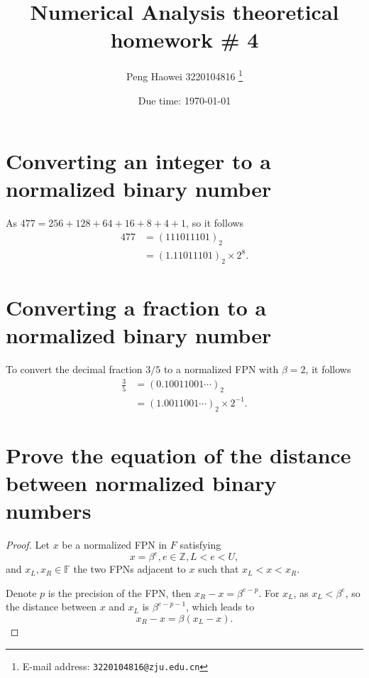 \documentclass[a4paper]{article}
\begin{document}
\title{\textbf{Numerical Analysis theoretical homework \# 4}}

\author{Peng Haowei 3220104816
  \thanks{E-mail address: \texttt{3220104816@zju.edu.cn}}}

\date{Due time: \today}

\maketitle

\section{Converting an integer to a normalized binary number}

As $477 = 256 + 128 + 64 + 16 + 8 + 4 + 1$, so it follows
\begin{equation}
    \begin{aligned}
        477 &= (111011101)_2 \\
        &= (1.11011101)_2 \times 2^8.
    \end{aligned}
    \label{eq:1_to_binary}
\end{equation}

\section{Converting a fraction to a normalized binary number}
\label{sec:2}

To convert the decimal fraction $3/5$ to a normalized FPN with $\beta = 2$, it follows
\begin{equation}
    \begin{aligned}
        \frac{3}{5} &= (0.10011001\cdots)_2 \\
        &= (1.0011001\cdots)_2 \times 2^{-1}.
    \end{aligned}
    \label{eq:2_to_binary}
\end{equation}

\section{Prove the equation of the distance between normalized binary numbers}

\begin{proof}
    Let $x$ be a normalized FPN in $F$ satisfying
    \begin{equation}
        x = \beta^e, e \in \mathbb{Z}, L < e < U,
        \label{eq:3_defintion_x}
    \end{equation}
    and $x_L, x_R \in \mathbb{F}$ the two FPNs adjacent to $x$ such that $x_L < x < x_R$.
    
    Denote $p$ is the precision of the FPN, then $x_R - x = \beta^{e - p}$. For $x_L$, as $x_L < \beta^e$, so the distance between $x$ and $x_L$ is $\beta^{e - p - 1}$, which leads to
    \begin{equation}
        x_R - x = \beta(x_L - x).
        \label{eq:3_distance}
    \end{equation}
\end{proof}
\end{document}

